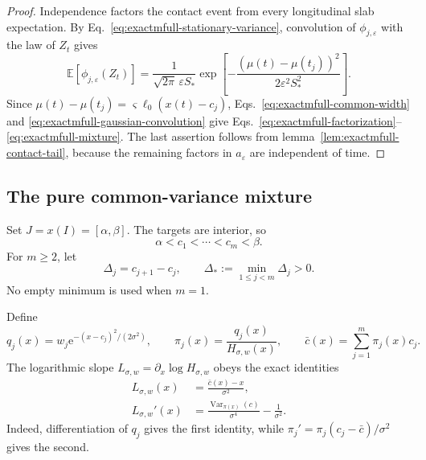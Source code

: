 \documentclass{iopjournal}
\newcommand{\e}{\mathrm e}
\theoremstyle{plain}
\theoremstyle{definition}
\begin{document}
\begin{proof}
Independence factors the contact event from every longitudinal slab
expectation.  By Eq.~\eqref{eq:exactmfull-stationary-variance}, convolution
of \(\phi_{j,\varepsilon}\) with the law of \(Z_t\) gives
\begin{equation}
 \mathbb E[\phi_{j,\varepsilon}(Z_t)]
 =\frac{1}{\sqrt{2\pi}\,\varepsilon S_*}
 \exp\!\left[-\frac{(\mu(t)-\mu(t_j))^2}
 {2\varepsilon^2S_*^2}\right].
 \label{eq:exactmfull-gaussian-convolution}
\end{equation}
Since
\(\mu(t)-\mu(t_j)=\varsigma\ell_0(x(t)-c_j)\),
Eqs.~\eqref{eq:exactmfull-common-width} and
\eqref{eq:exactmfull-gaussian-convolution} give
Eqs.~\eqref{eq:exactmfull-factorization}--
\eqref{eq:exactmfull-mixture}.  The last assertion follows from
lemma~\ref{lem:exactmfull-contact-tail}, because the remaining factors in
\(a_\varepsilon\) are independent of time.
\end{proof}

\subsection{The pure common-variance mixture}
\label{subsec:exactmfull-pure-mixture}

Set \(J=x(I)=[\alpha,\beta]\).  The targets are interior, so
\begin{equation}
 \alpha<c_1<\cdots<c_m<\beta.
 \label{eq:exactmfull-centre-order}
\end{equation}
For \(m\ge2\), let
\begin{equation}
 \Delta_j=c_{j+1}-c_j,
 \qquad \Delta_*:=\min_{1\le j<m}\Delta_j>0.
 \label{eq:exactmfull-gaps}
\end{equation}
No empty minimum is used when \(m=1\).

Define
\begin{equation}
 q_j(x)=w_j\e^{-(x-c_j)^2/(2\sigma^2)},
 \qquad
 \pi_j(x)=\frac{q_j(x)}{H_{\sigma,w}(x)},
 \qquad
 \bar c(x)=\sum_{j=1}^m\pi_j(x)c_j.
 \label{eq:exactmfull-posterior}
\end{equation}
The logarithmic slope \(L_{\sigma,w}=\partial_x\log H_{\sigma,w}\) obeys
the exact identities
\begin{align}
 L_{\sigma,w}(x)
 &=\frac{\bar c(x)-x}{\sigma^2},
 \label{eq:exactmfull-log-slope}\\
 L_{\sigma,w}'(x)
 &=\frac{\operatorname{Var}_{\pi(x)}(c)}{\sigma^4}
   -\frac{1}{\sigma^2}.
 \label{eq:exactmfull-log-slope-derivative}
\end{align}
Indeed, differentiation of \(q_j\) gives the first identity, while
\(\pi_j'=\pi_j(c_j-\bar c)/\sigma^2\) gives the second.
\end{document}
